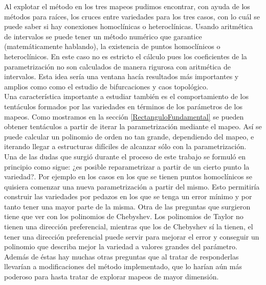 Al explotar el método en los tres mapeos pudimos encontrar, con ayuda de los métodos para raíces, los cruces entre variedades para los tres casos, con lo cuál se puede saber si hay conexiones homoclínicas o heteroclínicas. Usando aritmética de intervalos se puede tener un método numérico que garantice (matemáticamente hablando), la existencia de puntos homoclínicos o heteroclínicos. En este caso no es estricto el cálculo pues los coeficientes de la parametrización no son calculados de manera rigurosa con aritmética de intervalos. Esta idea sería una ventana hacía resultados más importantes y amplios como como el estudio de bifurcaciones y caos topológico.\\

Una característica importante a estudiar también es el comportamiento de los tentáculos formados por las variedades en términos de los parámetros de los mapeos. Como mostramos en la sección \ref{RectanguloFundamental} se pueden obtener tentáculos a partir de iterar la parametrización mediante el mapeo. Así se puede calcular un polinomio de orden no tan grande, dependiendo del mapeo, e iterando llegar a estructuras difíciles de alcanzar sólo con la parametrización.\\

Una de las dudas que surgió durante el proceso de este trabajo se formuló en principio como sigue: ¿es posible reparametrizar a partir de un cierto punto la variedad?. Por ejemplo en los casos en los que se tienen puntos homoclínicos se quisiera comenzar una nueva parametrización a partir del mismo. Esto permitiría construir las variedades por pedazos en los que se tenga un error mínimo y por tanto tener una mayor parte de la misma. Otra de las preguntas que surgieron tiene que ver con los polinomios de Chebyshev. Los polinomios de Taylor no tienen una dirección preferencial, mientras que los de Chebyshev sí la tienen, el tener una dirección preferencial puede servir para mejorar el error y conseguir un polinomio que describa mejor la variedad a valores grandes del parámetro. Además de éstas hay muchas otras preguntas que al tratar de responderlas llevarían a modificaciones del método implementado, que lo harían aún más poderoso para hasta tratar de explorar mapeos de mayor dimensión.

